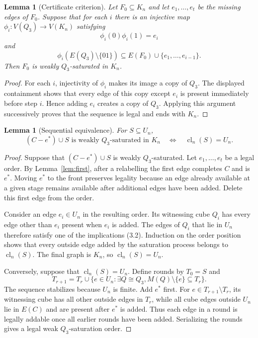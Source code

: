 \documentclass[11pt]{article}
\numberwithin{equation}{section}
\newtheorem{lemma}[theorem]{Lemma}
\newcommand{\cl}{\operatorname{cl}}
\begin{document}
\begin{lemma}[Certificate criterion]\label{lem:certificate}
Let $F_0\subseteq K_n$ and let $e_1,\ldots,e_t$ be the missing edges of $F_0$. Suppose that for each $i$ there is an injective map $\phi_i:V(Q_3)\to V(K_n)$ satisfying
\[
\phi_i(0)\phi_i(1)=e_i
\]
and
\[
\phi_i(E(Q_3)\setminus\{01\})\subseteq E(F_0)\cup\{e_1,\ldots,e_{i-1}\}.
\]
Then $F_0$ is weakly $Q_3$-saturated in $K_n$.
\end{lemma}

\begin{proof}
For each $i$, injectivity of $\phi_i$ makes its image a copy of $Q_3$. The displayed containment shows that every edge of this copy except $e_i$ is present immediately before step $i$. Hence adding $e_i$ creates a copy of $Q_3$. Applying this argument successively proves that the sequence is legal and ends with $K_n$.
\end{proof}

\begin{lemma}[Sequential equivalence]\label{lem:seq}
For $S\subseteq U_n$,
\[
(C-e^*)\cup S\text{ is weakly $Q_3$-saturated in }K_n
\quad\Longleftrightarrow\quad
\cl_n(S)=U_n.
\]
\end{lemma}

\begin{proof}
Suppose that $(C-e^*)\cup S$ is weakly $Q_3$-saturated. Let
$e_1,\ldots,e_t$ be a legal order. By Lemma~\ref{lem:first}, after a
relabelling the first edge completes $C$ and is $e^*$. Moving $e^*$ to the
front preserves legality because an edge already available at a given stage
remains available after additional edges have been added. Delete this first
edge from the order.

Consider an edge $e_i\in U_n$ in the resulting order. Its witnessing cube
$Q_i$ has every edge other than $e_i$ present when $e_i$ is added. The edges of
$Q_i$ that lie in $U_n$ therefore satisfy one of the implications (3.2).
Induction on the order position shows that every outside edge added by the
saturation process belongs to $\cl_n(S)$. The final graph is $K_n$, so
$\cl_n(S)=U_n$.

Conversely, suppose that $\cl_n(S)=U_n$. Define rounds by
$T_0=S$ and
\[
T_{r+1}=T_r\cup\{e\in U_n:\exists Q\cong Q_3,
M(Q)\setminus\{e\}\subseteq T_r\}.
\]
The sequence stabilizes because $U_n$ is finite. Add $e^*$ first. For
$e\in T_{r+1}\setminus T_r$, its witnessing cube has all other outside
edges in $T_r$, while all cube edges outside $U_n$ lie in $E(C)$ and are
present after $e^*$ is added. Thus each edge in a round is legally addable
once all earlier rounds have been added. Serializing the rounds gives a legal
weak $Q_3$-saturation order.
\end{proof}
\end{document}
